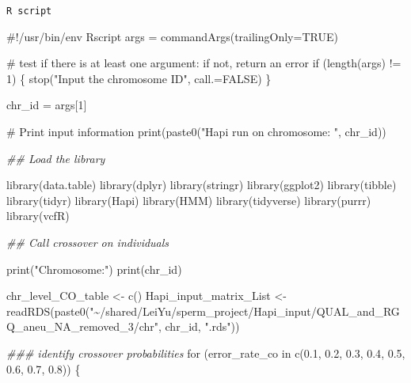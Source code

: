 \documentclass[
  letterpaper,
  DIV=11,
  numbers=noendperiod]{scrreprt}
\newenvironment{Shaded}{\begin{snugshade}}{\end{snugshade}}
\newcommand{\AttributeTok}[1]{\textcolor[rgb]{0.40,0.45,0.13}{#1}}
\newcommand{\CommentTok}[1]{\textcolor[rgb]{0.37,0.37,0.37}{#1}}
\newcommand{\ConstantTok}[1]{\textcolor[rgb]{0.56,0.35,0.01}{#1}}
\newcommand{\ControlFlowTok}[1]{\textcolor[rgb]{0.00,0.23,0.31}{#1}}
\newcommand{\DecValTok}[1]{\textcolor[rgb]{0.68,0.00,0.00}{#1}}
\newcommand{\DocumentationTok}[1]{\textcolor[rgb]{0.37,0.37,0.37}{\textit{#1}}}
\newcommand{\FloatTok}[1]{\textcolor[rgb]{0.68,0.00,0.00}{#1}}
\newcommand{\FunctionTok}[1]{\textcolor[rgb]{0.28,0.35,0.67}{#1}}
\newcommand{\NormalTok}[1]{\textcolor[rgb]{0.00,0.23,0.31}{#1}}
\newcommand{\OtherTok}[1]{\textcolor[rgb]{0.00,0.23,0.31}{#1}}
\newcommand{\SpecialCharTok}[1]{\textcolor[rgb]{0.37,0.37,0.37}{#1}}
\newcommand{\StringTok}[1]{\textcolor[rgb]{0.13,0.47,0.30}{#1}}
\begin{document}
\begin{codelisting}

\caption{\texttt{R script}}

\begin{Shaded}
\begin{Highlighting}[]
\CommentTok{\#!/usr/bin/env Rscript}
\NormalTok{args }\OtherTok{=} \FunctionTok{commandArgs}\NormalTok{(}\AttributeTok{trailingOnly=}\ConstantTok{TRUE}\NormalTok{)}

\CommentTok{\# test if there is at least one argument: if not, return an error}
\ControlFlowTok{if}\NormalTok{ (}\FunctionTok{length}\NormalTok{(args) }\SpecialCharTok{!=} \DecValTok{1}\NormalTok{) \{}
  \FunctionTok{stop}\NormalTok{(}\StringTok{"Input the chromosome ID"}\NormalTok{, }\AttributeTok{call.=}\ConstantTok{FALSE}\NormalTok{)}
\NormalTok{\} }

\NormalTok{chr\_id }\OtherTok{=}\NormalTok{ args[}\DecValTok{1}\NormalTok{]}


\CommentTok{\# Print input information }
\FunctionTok{print}\NormalTok{(}\FunctionTok{paste0}\NormalTok{(}\StringTok{"Hapi run on chromosome: "}\NormalTok{, chr\_id))}


\DocumentationTok{\#\# Load the library}

\FunctionTok{library}\NormalTok{(data.table)}
\FunctionTok{library}\NormalTok{(dplyr)}
\FunctionTok{library}\NormalTok{(stringr)}
\FunctionTok{library}\NormalTok{(ggplot2)}
\FunctionTok{library}\NormalTok{(tibble)}
\FunctionTok{library}\NormalTok{(tidyr)}
\FunctionTok{library}\NormalTok{(Hapi)}
\FunctionTok{library}\NormalTok{(HMM)}
\FunctionTok{library}\NormalTok{(tidyverse)}
\FunctionTok{library}\NormalTok{(purrr)}
\FunctionTok{library}\NormalTok{(vcfR)}


\DocumentationTok{\#\# Call crossover on individuals }

\FunctionTok{print}\NormalTok{(}\StringTok{"Chromosome:"}\NormalTok{)}
\FunctionTok{print}\NormalTok{(chr\_id)}

\NormalTok{chr\_level\_CO\_table }\OtherTok{\textless{}{-}} \FunctionTok{c}\NormalTok{()}
\NormalTok{Hapi\_input\_matrix\_List }\OtherTok{\textless{}{-}} \FunctionTok{readRDS}\NormalTok{(}\FunctionTok{paste0}\NormalTok{(}\StringTok{"\textasciitilde{}/shared/LeiYu/sperm\_project/Hapi\_input/QUAL\_and\_RGQ\_aneu\_NA\_removed\_3/chr"}\NormalTok{, chr\_id, }\StringTok{".rds"}\NormalTok{))}



\DocumentationTok{\#\#\# identify crossover probabilities}
\ControlFlowTok{for}\NormalTok{ (error\_rate\_co }\ControlFlowTok{in} \FunctionTok{c}\NormalTok{(}\FloatTok{0.1}\NormalTok{, }\FloatTok{0.2}\NormalTok{, }\FloatTok{0.3}\NormalTok{, }\FloatTok{0.4}\NormalTok{, }\FloatTok{0.5}\NormalTok{, }\FloatTok{0.6}\NormalTok{, }\FloatTok{0.7}\NormalTok{, }\FloatTok{0.8}\NormalTok{)) \{}
  

\end{Highlighting}
\end{Shaded}
\end{codelisting}
\end{document}
